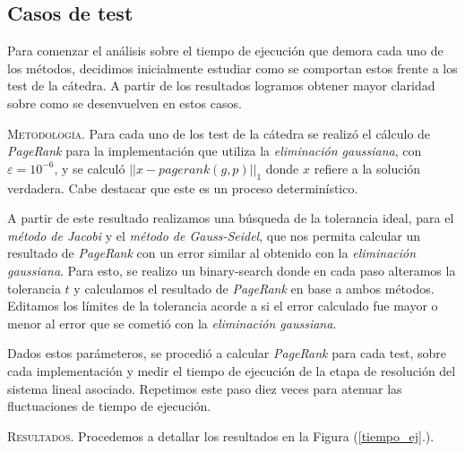\subsection{Casos de test}

Para comenzar el análisis sobre el tiempo de ejecución que demora cada uno de los métodos, decidimos inicialmente estudiar como se comportan estos frente a los test de la cátedra. A partir de los resultados logramos obtener mayor claridad sobre como se desenvuelven en estos casos. %

\vspace{2em}
\noindent\textsc{Metodología}. Para cada uno de los test de la cátedra se realizó el cálculo de \textit{PageRank} para la implementación que utiliza la \textit{eliminación gaussiana}, con $\varepsilon = 10^{-6}$, y se calculó $||x - pagerank(g, p)||_1$ donde $x$ refiere a la solución verdadera. Cabe destacar que este es un proceso determinístico. 

A partir de este resultado realizamos una búsqueda de la tolerancia ideal, para el \textit{método de Jacobi} y el \textit{método de Gauss-Seidel}, que nos permita calcular un resultado de \textit{PageRank} con un error similar al obtenido con la \textit{eliminación gaussiana}. Para esto, se realizo un binary-search donde en cada paso alteramos la tolerancia $t$ y calculamos el resultado de \textit{PageRank} en base a ambos métodos. Editamos los límites de la tolerancia acorde a si el error calculado fue mayor o menor al error que se cometió con la \textit{eliminación gaussiana}. %


\vspace{1em}
Dados estos parámeteros, se procedió a calcular \textit{PageRank} para cada test, sobre cada implementación y medir el tiempo de ejecución de la etapa de resolución del sistema lineal asociado. Repetimos este paso diez veces para atenuar las fluctuaciones de tiempo de ejecución. 

\vspace{2em}
\noindent \textsc{Resultados}. Procedemos a detallar los resultados en la Figura (\ref{tiempo_ej}.). 

